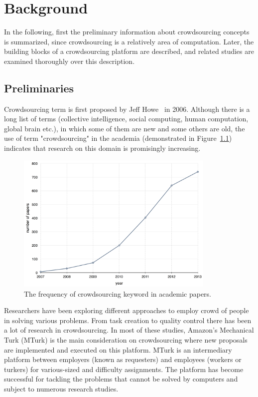 \chapter{Background}
\label{chap:background}

In the following, first the preliminary information about crowdsourcing concepts 
is summarized, since crowdsourcing is a relatively area of computation. Later,
the building blocks of a crowdsourcing platform are described, and related studies 
are examined thoroughly over this description.

\section{Preliminaries}
Crowdsourcing term is first proposed by Jeff Howe~\cite{Howe2006b} in 2006. 
Although there is a long list of terms (collective intelligence, social computing, 
human computation, global brain etc.), in which some of them are new and some 
others are old, the use of term "crowdsourcing" in the academia (demonstrated in 
Figure~\ref{fig:keywordstats}) indicates that research on this domain is promisingly 
increasing.

\begin{figure}[ht]
	\centering
	\includegraphics[width=0.85\textwidth]{figures/keyword_statistics.png}
	\caption[The frequency of crowdsourcing keyword in academic papers.]{The frequency of crowdsourcing keyword in academic papers.\footnotemark}
	\label{fig:keywordstats}
\end{figure}

Researchers have been exploring different approaches to employ crowd of people 
in solving various problems. From task creation to quality control there has been a 
lot of research in crowdsourcing.  In most of these studies, Amazon's Mechanical 
Turk (MTurk) is the main consideration on crowdsourcing where new proposals are 
implemented and executed on this platform. MTurk is an 
intermediary platform between employers (known as requesters) 
and employees (workers or turkers) for various-sized and difficulty assignments. 
The platform has become successful for tackling the problems that cannot be 
solved by computers and subject to numerous research studies.

